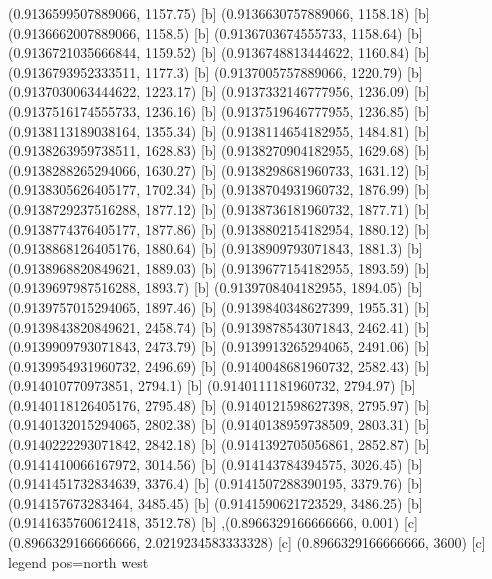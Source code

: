 {{{(0.9136599507889066, 1157.75) [b] 
(0.9136630757889066, 1158.18) [b] 
(0.9136662007889066, 1158.5) [b] 
(0.9136703674555733, 1158.64) [b] 
(0.9136721035666844, 1159.52) [b] 
(0.9136748813444622, 1160.84) [b] 
(0.9136793952333511, 1177.3) [b] 
(0.9137005757889066, 1220.79) [b] 
(0.9137030063444622, 1223.17) [b] 
(0.9137332146777956, 1236.09) [b] 
(0.9137516174555733, 1236.16) [b] 
(0.9137519646777955, 1236.85) [b] 
(0.9138113189038164, 1355.34) [b] 
(0.9138114654182955, 1484.81) [b] 
(0.9138263959738511, 1628.83) [b] 
(0.9138270904182955, 1629.68) [b] 
(0.9138288265294066, 1630.27) [b] 
(0.9138298681960733, 1631.12) [b] 
(0.9138305626405177, 1702.34) [b] 
(0.9138704931960732, 1876.99) [b] 
(0.9138729237516288, 1877.12) [b] 
(0.9138736181960732, 1877.71) [b] 
(0.9138774376405177, 1877.86) [b] 
(0.9138802154182954, 1880.12) [b] 
(0.9138868126405176, 1880.64) [b] 
(0.9138909793071843, 1881.3) [b] 
(0.9138968820849621, 1889.03) [b] 
(0.9139677154182955, 1893.59) [b] 
(0.9139697987516288, 1893.7) [b] 
(0.9139708404182955, 1894.05) [b] 
(0.9139757015294065, 1897.46) [b] 
(0.9139840348627399, 1955.31) [b] 
(0.9139843820849621, 2458.74) [b] 
(0.9139878543071843, 2462.41) [b] 
(0.9139909793071843, 2473.79) [b] 
(0.9139913265294065, 2491.06) [b] 
(0.9139954931960732, 2496.69) [b] 
(0.9140048681960732, 2582.43) [b] 
(0.914010770973851, 2794.1) [b] 
(0.9140111181960732, 2794.97) [b] 
(0.9140118126405176, 2795.48) [b] 
(0.9140121598627398, 2795.97) [b] 
(0.9140132015294065, 2802.38) [b] 
(0.9140138959738509, 2803.31) [b] 
(0.9140222293071842, 2842.18) [b] 
(0.9141392705056861, 2852.87) [b] 
(0.9141410066167972, 3014.56) [b] 
(0.914143784394575, 3026.45) [b] 
(0.9141451732834639, 3376.4) [b] 
(0.9141507288390195, 3379.76) [b] 
(0.914157673283464, 3485.45) [b] 
(0.9141590621723529, 3486.25) [b] 
(0.9141635760612418, 3512.78) [b] 
},{(0.8966329166666666, 0.001) [c] 
(0.8966329166666666, 2.0219234583333328) [c] 
(0.8966329166666666, 3600) [c] 
}}}{legend pos=north west}